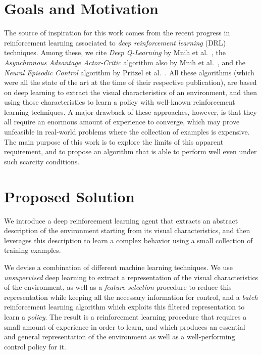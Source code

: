 \section{Goals and Motivation}
The source of inspiration for this work comes from the recent progress in 
reinforcement learning associated to \textit{deep reinforcement learning} (DRL)
techniques. 
Among these, we cite \textit{Deep Q-Learning} by Mnih et al.\ \cite{mnih2015human},
the \textit{Asynchronous Advantage Actor-Critic} algorithm also by Mnih et 
al.\ \cite{mnih2016asynchronous}, and the \textit{Neural Episodic Control} 
algorithm by Pritzel et al.\ \cite{pritzel2017neural}.
All these algorithms (which were all the state of the art at the time of
their respective publication), are based on deep learning to extract 
the visual characteristics of an environment, and then using those 
characteristics to learn a policy with well-known reinforcement learning 
techniques. A major drawback of these approaches, however, is that they all 
require an enormous amount of experience to converge, which may prove unfeasible
in real-world problems where the collection of examples is expensive.
The main purpose of this work is to explore the limits of this apparent 
requirement, and to propose an algorithm that is able to perform well even under 
such scarcity conditions.

\section{Proposed Solution}
We introduce a deep reinforcement learning agent that extracts an abstract 
description of the environment starting from its visual characteristics, and 
then leverages this description to learn a complex behavior using a small 
collection of training examples.

We devise a combination of different machine learning techniques. We use 
\textit{unsupervised} deep learning to extract a representation of the visual 
characteristics of the environment, as well as a \textit{feature selection}
procedure to reduce this representation while keeping all the necessary 
information for control, and a \textit{batch} reinforcement learning algorithm 
which exploits this filtered representation to learn a \textit{policy}.
The result is a reinforcement learning procedure that requires a small amount
of experience in order to learn, and which produces an essential and 
general representation of the environment as well as a well-performing control 
policy for it.

